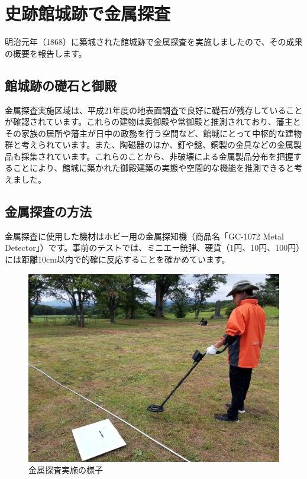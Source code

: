 \documentclass[a4j,11pt,twocolumn,openany]{jsbook}
\begin{document}
\newpage
\section{史跡館城跡で金属探査}

明治元年（1868）に築城された館城跡で金属探査を実施しましたので、その成果の概要を報告します。

\subsection{館城跡の礎石と御殿}
金属探査実施区域は、平成21年度の地表面調査で良好に礎石が残存していることが確認されています。これらの建物は奥御殿や常御殿と推測されており、藩主とその家族の居所や藩主が日中の政務を行う空間など、館城にとって中枢的な建物群と考えられています。また、陶磁器のほか、釘や鎹、銅製の金具などの金属製品も採集されています。これらのことから、非破壊による金属製品分布を把握することにより、館城に築かれた御殿建築の実態や空間的な機能を推測できると考えました。

\subsection{金属探査の方法}

金属探査に使用した機材はホビー用の金属探知機（商品名「GC-1072 Metal Detector」）です。事前のテストでは、ミニエー銃弾、硬貨（1円、10円、100円）には距離10cm以内で的確に反応することを確かめています。

\begin{figure}[h]
	\centering
	\includegraphics[width=\linewidth]{fig/07_Ishii/02survey_pic.jpg}
	\caption{金属探査実施の様子}
	\label{metal_pic}
	\vspace{-1\baselineskip}
\end{figure}
\end{document}

